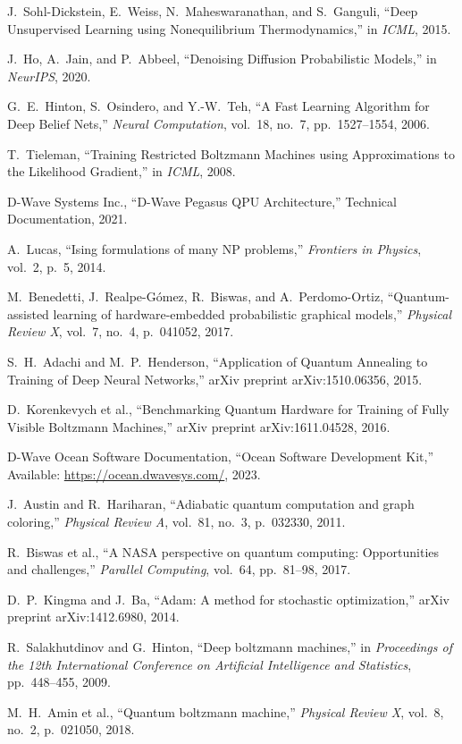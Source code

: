 \documentclass[11pt]{article}
\begin{document}
\begin{thebibliography}{20}\setlength{\itemsep}{2pt}

J.~Sohl-Dickstein, E.~Weiss, N.~Maheswaranathan, and S.~Ganguli,
``Deep Unsupervised Learning using Nonequilibrium Thermodynamics,''
in \emph{ICML}, 2015.

J.~Ho, A.~Jain, and P.~Abbeel,
``Denoising Diffusion Probabilistic Models,''
in \emph{NeurIPS}, 2020.

G.~E.~Hinton, S.~Osindero, and Y.-W.~Teh,
``A Fast Learning Algorithm for Deep Belief Nets,''
\emph{Neural Computation}, vol.~18, no.~7, pp.~1527--1554, 2006.

T.~Tieleman,
``Training Restricted Boltzmann Machines using Approximations to the Likelihood Gradient,''
in \emph{ICML}, 2008.

D-Wave Systems Inc.,
``D-Wave Pegasus QPU Architecture,''
Technical Documentation, 2021.

A.~Lucas,
``Ising formulations of many NP problems,''
\emph{Frontiers in Physics}, vol.~2, p.~5, 2014.

M.~Benedetti, J.~Realpe-G\'{o}mez, R.~Biswas, and A.~Perdomo-Ortiz,
``Quantum-assisted learning of hardware-embedded probabilistic graphical models,''
\emph{Physical Review X}, vol.~7, no.~4, p.~041052, 2017.

S.~H.~Adachi and M.~P.~Henderson,
``Application of Quantum Annealing to Training of Deep Neural Networks,''
arXiv preprint arXiv:1510.06356, 2015.

D.~Korenkevych et al.,
``Benchmarking Quantum Hardware for Training of Fully Visible Boltzmann Machines,''
arXiv preprint arXiv:1611.04528, 2016.

D-Wave Ocean Software Documentation,
``Ocean Software Development Kit,''
Available: \url{https://ocean.dwavesys.com/}, 2023.

J.~Austin and R.~Hariharan,
``Adiabatic quantum computation and graph coloring,''
\emph{Physical Review A}, vol.~81, no.~3, p.~032330, 2011.

R.~Biswas et al.,
``A NASA perspective on quantum computing: Opportunities and challenges,''
\emph{Parallel Computing}, vol.~64, pp.~81--98, 2017.

D.~P.~Kingma and J.~Ba,
``Adam: A method for stochastic optimization,''
arXiv preprint arXiv:1412.6980, 2014.

R.~Salakhutdinov and G.~Hinton,
``Deep boltzmann machines,''
in \emph{Proceedings of the 12th International Conference on Artificial Intelligence and Statistics}, pp.~448--455, 2009.

M.~H.~Amin et al.,
``Quantum boltzmann machine,''
\emph{Physical Review X}, vol.~8, no.~2, p.~021050, 2018.

\end{thebibliography}
\end{document}

